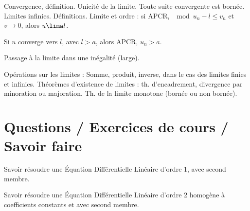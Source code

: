 \documentclass[a4paper,french,bookmarks]{article}
\begin{document}
\begin{enumerate}
    \itarr Convergence, définition. Unicité de la limite. Toute suite convergente est bornée.
    \itarr Limites infinies. Définitions.
    \itarr Limite et ordre : si APCR, $\mod{u_n - l} \leq v_n$ et $v \xrightarrow{} 0$, alors $u \lima l$.
    
    Si $u$ converge vers $l$, avec $l > a$, alors APCR, $u_n > a$.
    
    Passage à la limite dans une inégalité (large).
    
    \itarr Opérations sur les limites : Somme, produit, inverse, dans le cas des limites finies et infinies.
    \itarr Théorèmes d’existence de limites : th. d’encadrement, divergence par minoration ou majoration.
    \itarr Th. de la limite monotone (bornée ou non bornée).
    
\end{enumerate}

\section*{Questions / Exercices de cours / Savoir faire}

Savoir résoudre une Équation Différentielle Linéaire d’ordre 1, avec second membre.

Savoir résoudre une Équation Différentielle Linéaire d’ordre 2 homogène à coefficients constants et avec second membre.
\end{document}
